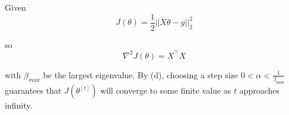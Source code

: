 \begin{answer}

Given
\begin{equation*}
	J(\theta) = \frac{1}{2}||X\theta - y||_2^2
\end{equation*}

so 
\begin{equation*}
	\nabla^2J(\theta) = X^\top X
\end{equation*}

with $\beta_{max}$ be the largest eigenvalue. By (d), choosing a step size $0 < \alpha < \frac{1}{\beta_{\max}}$ guarantees that $J(\theta^{[t]})$ will converge to some finite value as $t$ approaches infinity.
\end{answer}
